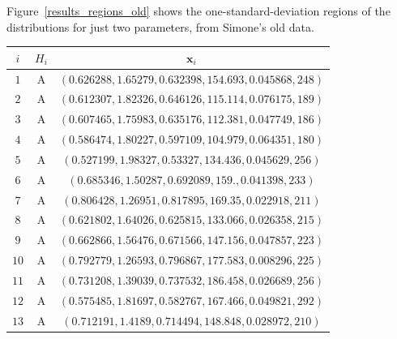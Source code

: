 \documentclass[\ifafour a4paper,12pt,\else a5paper,10pt,\fi%
onecolumn,oneside,article,%
british%
]{memoir}
\theoremstyle{remark}
\theoremstyle{innote}
\renewcommand*{\|}{\mathpunct{|}}
\newcommand*{\yH}{H}
\newcommand*{\yx}{x}
\newcommand*{\yxx}{\bm{\yx}}
\theoremstyle{plain}
\begin{document}
Figure~\ref{results_regions_old} shows the one-standard-deviation regions
of the distributions for just two parameters, from Simone's old data. 
\begin{table}[!h]
  \centering\footnotesize
    \begin{tabular}[t]{@{}c@{\quad}c@{\quad}c@{}}
      $i$ & $\yH_i$ & $\yxx_i$ \\ \midrule
$1$ & A & $(0.626288, 1.65279, 0.632398, 154.693, 0.045868, 248)$ \\
$2$ & A & $(0.612307, 1.82326, 0.646126, 115.114, 0.076175, 189)$ \\
$3$ & A & $(0.607465, 1.75983, 0.635176, 112.381, 0.047749, 186)$ \\
$4$ & A & $(0.586474, 1.80227, 0.597109, 104.979, 0.064351, 180)$ \\
$5$ & A & $(0.527199, 1.98327, 0.53327, 134.436, 0.045629, 256)$ \\
$6$ & A & $(0.685346, 1.50287, 0.692089, 159., 0.041398, 233)$ \\
$7$ & A & $(0.806428, 1.26951, 0.817895, 169.35, 0.022918, 211)$ \\
$8$ & A & $(0.621802, 1.64026, 0.625815, 133.066, 0.026358, 215)$ \\
$9$ & A & $(0.662866, 1.56476, 0.671566, 147.156, 0.047857, 223)$ \\
$10$ & A & $(0.792779, 1.26593, 0.796867, 177.583, 0.008296, 225)$ \\
$11$ & A & $(0.731208, 1.39039, 0.737532, 186.458, 0.026689, 256)$ \\
$12$ & A & $(0.575485, 1.81697, 0.582767, 167.466, 0.049821, 292)$ \\
$13$ & A & $(0.712191, 1.4189, 0.714494, 148.848, 0.028972, 210)$ \\[4\jot]


\end{tabular}
\end{table}
\end{document}
